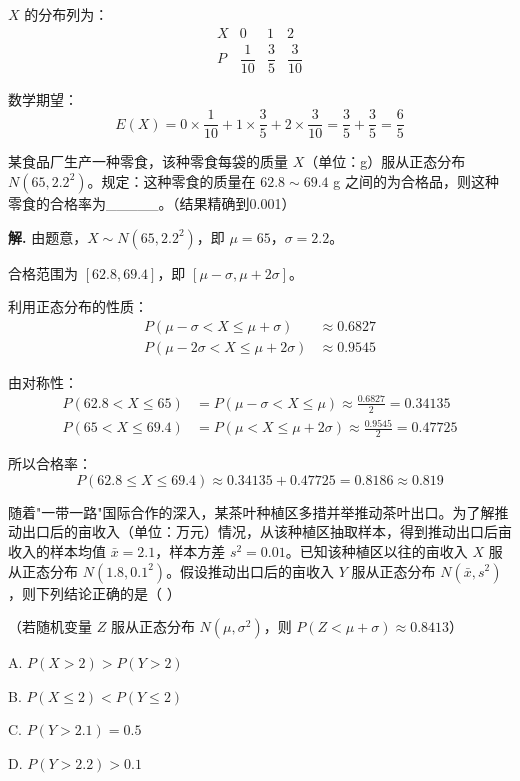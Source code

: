 \documentclass[11pt]{ctexrep}
\begin{document}
$X$ 的分布列为：
\[
\begin{array}{c|ccc}
X & 0 & 1 & 2 \\ \hline
P & \dfrac{1}{10} & \dfrac{3}{5} & \dfrac{3}{10}
\end{array}
\]

数学期望：
\[
E(X) = 0 \times \frac{1}{10} + 1 \times \frac{3}{5} + 2 \times \frac{3}{10} = \frac{3}{5} + \frac{3}{5} = \frac{6}{5}
\]

\begin{realexam}[2026 奉贤二模]
    某食品厂生产一种零食，该种零食每袋的质量 $X$（单位：g）服从正态分布 $N(65, 2.2^2)$。规定：这种零食的质量在 $62.8 \sim 69.4$ g 之间的为合格品，则这种零食的合格率为\_\_\_\_\_。（结果精确到0.001）
\end{realexam}

\textbf{解.} 由题意，$X \sim N(65, 2.2^2)$，即 $\mu = 65$，$\sigma = 2.2$。

合格范围为 $[62.8, 69.4]$，即 $[\mu - \sigma, \mu + 2\sigma]$。

利用正态分布的性质：
\begin{align*}
P(\mu - \sigma < X \le \mu + \sigma) &\approx 0.6827 \\
P(\mu - 2\sigma < X \le \mu + 2\sigma) &\approx 0.9545
\end{align*}

由对称性：
\begin{align*}
P(62.8 < X \le 65) &= P(\mu - \sigma < X \le \mu) \approx \frac{0.6827}{2} = 0.34135 \\
P(65 < X \le 69.4) &= P(\mu < X \le \mu + 2\sigma) \approx \frac{0.9545}{2} = 0.47725
\end{align*}

所以合格率：
\[
P(62.8 \le X \le 69.4) \approx 0.34135 + 0.47725 = 0.8186 \approx 0.819
\]

\begin{example}[正态分布综合应用]
    随着"一带一路"国际合作的深入，某茶叶种植区多措并举推动茶叶出口。为了解推动出口后的亩收入（单位：万元）情况，从该种植区抽取样本，得到推动出口后亩收入的样本均值 $\bar{x} = 2.1$，样本方差 $s^2 = 0.01$。已知该种植区以往的亩收入 $X$ 服从正态分布 $N(1.8, 0.1^2)$。假设推动出口后的亩收入 $Y$ 服从正态分布 $N(\bar{x}, s^2)$，则下列结论正确的是（  ）

    （若随机变量 $Z$ 服从正态分布 $N(\mu, \sigma^2)$，则 $P(Z < \mu + \sigma) \approx 0.8413$）

    A. $P(X > 2) > P(Y > 2)$

    B. $P(X \le 2) < P(Y \le 2)$

    C. $P(Y > 2.1) = 0.5$

    D. $P(Y > 2.2) > 0.1$
\end{example}
\end{document}
